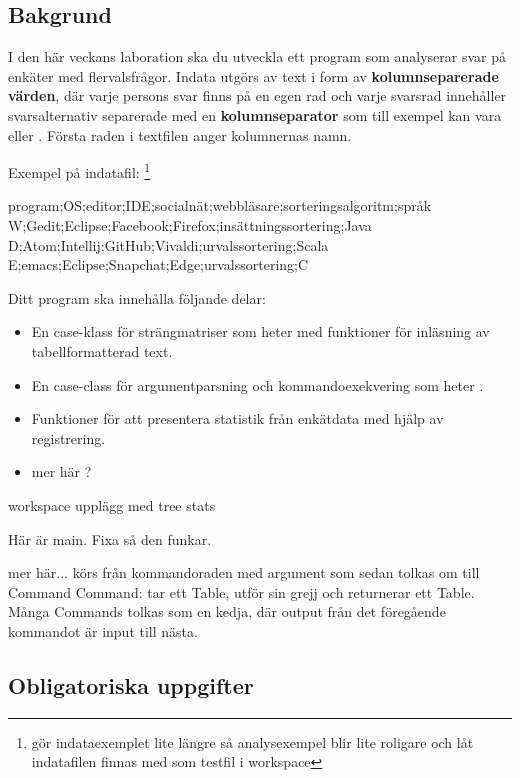 \subsection{Bakgrund}

I den här veckans laboration ska du utveckla ett program som analyserar svar på enkäter med flervalsfrågor. Indata utgörs av text i form av \textbf{kolumnseparerade värden}, där varje persons svar finns på en egen rad och varje svarsrad innehåller svarsalternativ separerade med en \textbf{kolumnseparator} som till exempel kan vara \code{;} eller \code{\t}. Första raden i textfilen anger kolumnernas namn.

Exempel på indatafil: \footnote{\TODO gör indataexemplet lite längre så analysexempel blir lite roligare och låt indatafilen finnas med som testfil i workspace}
\begin{CodeSmall}[language=, ]
program;OS;editor;IDE;socialnät;webbläsare;sorteringsalgoritm;språk
W;Gedit;Eclipse;Facebook;Firefox;insättningssortering;Java
D;Atom;Intellij;GitHub;Vivaldi;urvalssortering;Scala
E;emacs;Eclipse;Snapchat;Edge;urvalssortering;C
\end{CodeSmall}

Ditt program ska innehålla följande delar:
\begin{itemize}
\item En case-klass för strängmatriser som heter  med funktioner för inläsning av tabellformatterad text.
\item En case-class för argumentparsning och kommandoexekvering som heter . 
\item Funktioner för att presentera statistik från enkätdata med hjälp av registrering.
\item \TODO mer här ?
\end{itemize}

\TODO workspace upplägg med tree stats

Här är main. Fixa så den funkar.


\TODO mer här...
\TODO körs från kommandoraden med argument som sedan tolkas om till Command
\TODO Command: tar ett Table, utför sin grejj och returnerar ett Table. Många Commands tolkas som en kedja, där output från det föregående kommandot är input till nästa.


\subsection{Obligatoriska uppgifter}

